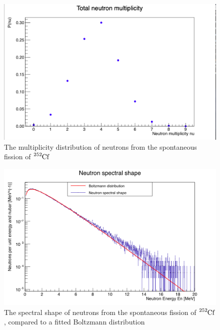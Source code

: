 \documentclass[]{article}
\begin{document}
\begin{figure} [H]
	\centering
	\includegraphics[scale=0.36]{Cf252_sf_total_n_mult.png}
	\caption{The multiplicity distribution of neutrons from the spontaneous fission of $\ce{^{252}Cf}$}
	\label{fig:Cf252_sf_total_n_mult}
\end{figure}

\begin{figure} [H]
	\centering
	\includegraphics[scale=0.36]{Cf252_sf_neutron_spectral_shape.png}
	\caption{The spectral shape of neutrons from the spontaneous fission of $\ce{^{252}Cf}$, compared to a fitted Boltzmann distribution}
	\label{fig:Cf252_sf_neutron_spectral_shape}
\end{figure}
\end{document}
